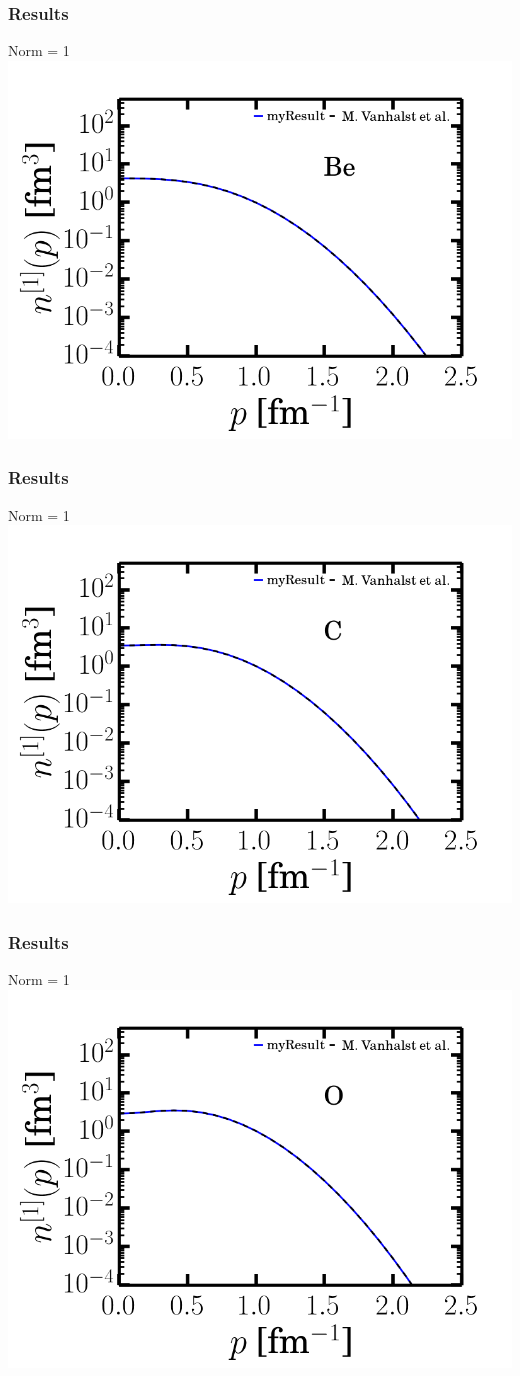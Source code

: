 \documentclass{beamer}
\begin{document}
\begin{frame}
\frametitle{Results}
Norm = 1
\includegraphics[scale=0.5]{Be_mf.png} 
\end{frame}
\begin{frame}
\frametitle{Results}
Norm = 1
\includegraphics[scale=0.5]{C_mf.png} 
\end{frame}
\begin{frame}
\frametitle{Results}
Norm = 1
\includegraphics[scale=0.5]{O_mf.png} 
\end{frame}
\end{document}
